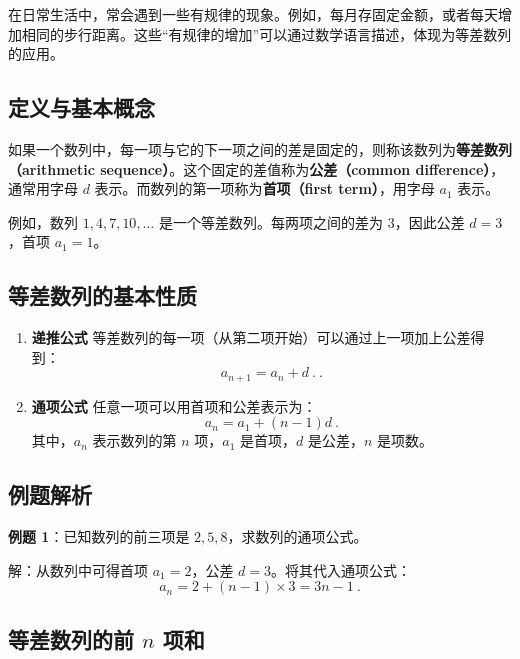 
\begin{issues}
\issueDraft
\end{issues}


在日常生活中，常会遇到一些有规律的现象。例如，每月存固定金额，或者每天增加相同的步行距离。这些“有规律的增加”可以通过数学语言描述，体现为等差数列的应用。

\subsection{定义与基本概念}

如果一个数列中，每一项与它的下一项之间的差是固定的，则称该数列为\textbf{等差数列（arithmetic sequence）}。这个固定的差值称为\textbf{公差（common difference）}，通常用字母 $d$ 表示。而数列的第一项称为\textbf{首项（first term）}，用字母 $a_1$ 表示。

例如，数列 $1, 4, 7, 10, \dots$ 是一个等差数列。每两项之间的差为 $3$，因此公差 $d=3$，首项 $a_1=1$。

\subsection{等差数列的基本性质}

\begin{enumerate}
    \item \textbf{递推公式}  
    等差数列的每一项（从第二项开始）可以通过上一项加上公差得到：
    \[
    a_{n+1} = a_n + d~.
    ~.\]

    \item \textbf{通项公式}  
    任意一项可以用首项和公差表示为：
    \[
    a_n = a_1 + (n-1)d
    ~.\]
    其中，$a_n$ 表示数列的第 $n$ 项，$a_1$ 是首项，$d$ 是公差，$n$ 是项数。
\end{enumerate}

\subsection{例题解析}

\textbf{例题 1}：已知数列的前三项是 $2, 5, 8$，求数列的通项公式。

解：从数列中可得首项 $a_1 = 2$，公差 $d = 3$。将其代入通项公式：
\[
a_n = 2 + (n-1) \times 3 = 3n - 1
~.\]

\subsection{等差数列的前 $n$ 项和}

